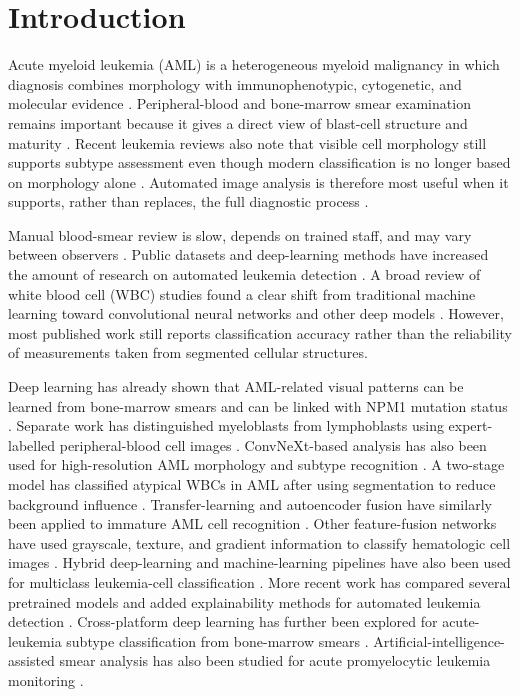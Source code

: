 \documentclass[pdflatex,sn-mathphys-num]{sn-jnl}%
\theoremstyle{thmstyleone}%
\theoremstyle{thmstyletwo}%
\theoremstyle{thmstylethree}%
\begin{document}

\maketitle


\section{Introduction}\label{sec:1}

Acute myeloid leukemia (AML) is a heterogeneous myeloid malignancy in which diagnosis combines morphology with immunophenotypic, cytogenetic, and molecular evidence \cite{1}. Peripheral-blood and bone-marrow smear examination remains important because it gives a direct view of blast-cell structure and maturity \cite{2}. Recent leukemia reviews also note that visible cell morphology still supports subtype assessment even though modern classification is no longer based on morphology alone \cite{3}. Automated image analysis is therefore most useful when it supports, rather than replaces, the full diagnostic process \cite{4}.

Manual blood-smear review is slow, depends on trained staff, and may vary between observers \cite{5}. Public datasets and deep-learning methods have increased the amount of research on automated leukemia detection \cite{6}. A broad review of white blood cell (WBC) studies found a clear shift from traditional machine learning toward convolutional neural networks and other deep models \cite{7}. However, most published work still reports classification accuracy rather than the reliability of measurements taken from segmented cellular structures.

Deep learning has already shown that AML-related visual patterns can be learned from bone-marrow smears and can be linked with NPM1 mutation status \cite{8}. Separate work has distinguished myeloblasts from lymphoblasts using expert-labelled peripheral-blood cell images \cite{9}. ConvNeXt-based analysis has also been used for high-resolution AML morphology and subtype recognition \cite{10}. A two-stage model has classified atypical WBCs in AML after using segmentation to reduce background influence \cite{11}. Transfer-learning and autoencoder fusion have similarly been applied to immature AML cell recognition \cite{12}. Other feature-fusion networks have used grayscale, texture, and gradient information to classify hematologic cell images \cite{13}. Hybrid deep-learning and machine-learning pipelines have also been used for multiclass leukemia-cell classification \cite{14}. More recent work has compared several pretrained models and added explainability methods for automated leukemia detection \cite{15}. Cross-platform deep learning has further been explored for acute-leukemia subtype classification from bone-marrow smears \cite{16}. Artificial-intelligence-assisted smear analysis has also been studied for acute promyelocytic leukemia monitoring \cite{17}.
\end{document}
